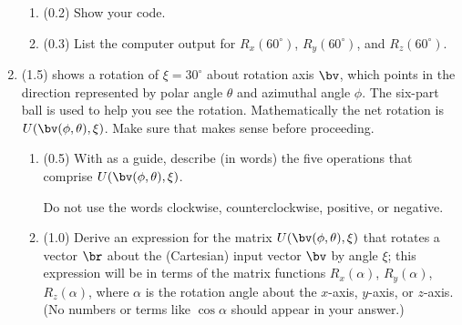 \documentclass[11pt,titlepage,fleqn]{article}
\newcommand{\rotangA}{\alpha}
\newcommand{\rotangB}{\xi}    %
\newcommand{\rotvec}{\bv}      %
\newcommand{\Rmat}{R}
\newcommand{\Umat}{U}
\begin{document}
\begin{enumerate}
\begin{enumerate}
\item (0.2) Show your code.

\item (0.3) List the computer output for $\Rmat_x(60^\circ)$, $\Rmat_y(60^\circ)$, and $\Rmat_z(60^\circ)$.
\end{enumerate}

\item (1.5)  shows a rotation of $\rotangB = 30^\circ$ about rotation axis $\rotvec$, which points in the direction represented by polar angle $\theta$ and azimuthal angle $\phi$. The six-part ball is used to help you see the rotation. Mathematically the net rotation is $\Umat(\rotvec(\phi,\theta),\rotangB)$. Make sure that  makes sense before proceeding.
%
\begin{enumerate}
\item (0.5) With  as a guide, describe (in words) the five operations that comprise $\Umat(\rotvec(\phi,\theta),\rotangB)$.

Do not use the words clockwise, counterclockwise, positive, or negative.

\item (1.0) Derive an expression for the matrix $\Umat(\rotvec(\phi,\theta),\rotangB)$ that rotates a vector $\br$ about the (Cartesian) input vector $\rotvec$ by angle $\rotangB$; this expression will be in terms of the matrix functions $\Rmat_x(\rotangA)$, $\Rmat_y(\rotangA)$, $\Rmat_z(\rotangA)$, where $\rotangA$ is the rotation angle about the $x$-axis, $y$-axis, or $z$-axis. (No numbers or terms like $\cos\rotangA$ should appear in your answer.)

\end{enumerate}


\end{enumerate}
\end{document}

